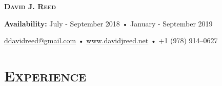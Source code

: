 \documentclass{article}
\begin{document}
\thispagestyle{empty}

\begin{center}
  {\LARGE\textsc{\textbf{David J. Reed}}}
\end{center}

\begin{center}
  \textbf{Availability:}
  July - September 2018 • January - September 2019
\end{center}

\begin{center}
  \href{mailto:ddavidreed@gmail.com}{ddavidreed@gmail.com} • \href{http://www.davidjreed.net/}{www.davidjreed.net} • +1 (978) 914--0627 \\
  \hrulefill
\end{center}


\section*{\textsc{Experience}}
\end{document}
